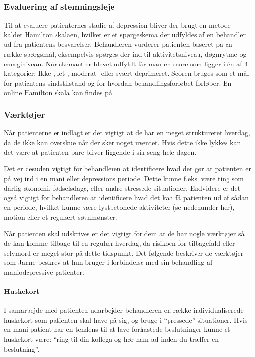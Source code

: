 \subsubsection{Evaluering af stemningsleje}
Til at evaluere patienternes stadie af depression bliver der brugt en metode kaldet Hamilton skalaen, hvilket er et spørgeskema der udfyldes af en behandler ud fra patientens besvarelser. 
Behandleren vurderer patienten baseret på en række spørgsmål, eksempelvis spørges der ind til aktivitetsniveau, døgnrytme og energiniveau.
Når skemaet er blevet udfyldt får man en score som ligger i én af 4 kategorier: Ikke-, let-, moderat- eller svært-deprimeret. 
Scoren bruges som et mål for patientens sindstilstand og for hvordan behandlingsforløbet forløber.
En online Hamilton skala kan findes på \citet{hamilton}.

\subsubsection{Værktøjer}
Når patienterne er indlagt er det vigtigt at de har en meget struktureret hverdag, da de ikke kan overskue når der sker noget uventet.
Hvis dette ikke lykkes kan det være at patienten bare bliver liggende i sin seng hele dagen.

Det er desuden vigtigt for behandleren at identificere hvad der gør at patienten er på vej ind i en mani eller depressions periode.
Dette kunne f.eks. være ting som dårlig økonomi, fødselsdage, eller andre stressede situationer.
Endvidere er det også vigtigt for behandleren at identificere hvad det kan få patienten ud af sådan en periode, hvilket kunne være lystbetonede aktiviteter (se nedenunder her), motion eller et regulært søvnmønster.

Når patienten skal udskrives er det vigtigt for dem at de har nogle værktøjer så de kan komme tilbage til en regulær hverdag, da risikoen for tilbagefald eller selvmord er meget stor på dette tidspunkt. 
Det følgende beskriver de værktøjer som Janne beskrev at hun bruger i forbindelse med sin behandling af maniodepressive patienter.

\paragraph{Huskekort}
I samarbejde med patienten udarbejder behandleren en række individualiserede huskekort som patienten skal have på sig, og bruge i ``pressede'' situationer. 
Hvis en mani patient har en tendens til at lave forhastede beslutninger kunne et huskekort være: ``ring til din kollega og hør ham ad inden du træffer en beslutning''.

